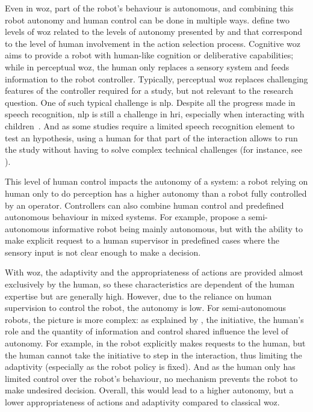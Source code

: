 Even in \gls{woz}, part of the robot's behaviour is autonomous, and combining this robot autonomy and human control can be done in multiple ways. \cite{baxter2016characterising} define two levels of \gls{woz} related to the levels of autonomy presented by \cite{beer2014toward} and that correspond to the level of human involvement in the action selection process. Cognitive \gls{woz} aims to provide a robot with human-like cognition or deliberative capabilities; while in perceptual \gls{woz}, the human only replaces a sensory system and feeds information to the robot controller. Typically, perceptual \gls{woz} replaces challenging features of the controller required for a study, but not relevant to the research question. One of such typical challenge is \gls{nlp}. Despite all the progress made in speech recognition, \gls{nlp} is still a challenge in \gls{hri}, especially when interacting with children~\citep{kennedy2017child}. And as some studies require a limited speech recognition element to test an hypothesis, using a human for that part of the interaction allows to run the study without having to solve complex technical challenges (for instance, see \citealt{cakmak2010designing}).

This level of human control impacts the autonomy of a system: a robot relying on human only to do perception has a higher autonomy than a robot fully controlled by an operator. Controllers can also combine human control and predefined autonomous behaviour in mixed systems. For example, \citet{shiomi2008semi} propose a semi-autonomous informative robot being mainly autonomous, but with the ability to make explicit request to a human supervisor in predefined cases where the sensory input is not clear enough to make a decision. 

With \gls{woz}, the adaptivity and the appropriateness of actions are provided almost exclusively by the human, so these characteristics are dependent of the human expertise but are generally high. However, due to the reliance on human supervision to control the robot, the autonomy is low. For semi-autonomous robots, the picture is more complex: as explained by \cite{beer2014toward}, the initiative, the human's role and the quantity of information and control shared influence the level of autonomy. For example, in \citet{shiomi2008semi} the robot explicitly makes requests to the human, but the human cannot take the initiative to step in the interaction, thus limiting the adaptivity (especially as the robot policy is fixed). And as the human only has limited control over the robot's behaviour, no mechanism prevents the robot to make undesired decision. Overall, this would lead to a higher autonomy, but a lower appropriateness of actions and adaptivity compared to classical \gls{woz}.

